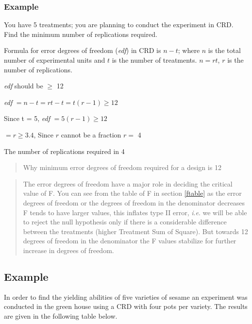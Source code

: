 \documentclass[
]{book}
\begin{document}
\hypertarget{example-10}{%
\subsubsection*{Example}\label{example-10}}

You have 5 treatments; you are planning to conduct the experiment in CRD. Find the minimum number of replications required.

Formula for error degrees of freedom (\emph{edf}) in CRD is \(n - t\); where \(n\) is the total number of experimental units and \(t\) is the number of treatments. \(n = rt\), \(r\) is the number of replications.

\emph{edf} should be \(\geq\) 12

\emph{edf} \(= n - t = rt - t = t\left( r - 1 \right) \geq 12\)

Since t = 5, \emph{edf} \(= 5\left( r - 1 \right) \geq 12\)

\(= r \geq 3.4\), Since \(r\) cannot be a fraction \(r =\) 4

The number of replications required in 4

\begin{quote}
Why minimum error degrees of freedom required for a design is 12
\end{quote}

\begin{quote}
The error degrees of freedom have a major role in deciding the critical value of F. You can see from the table of F in section \ref{ftable} as the error degrees of freedom or the degrees of freedom in the denominator decreases F tends to have larger values, this inflates type II error, \emph{i}.\emph{e}. we will be able to reject the null hypothesis only if there is a considerable difference between the treatments (higher
Treatment Sum of Square). But towards 12 degrees of freedom in the denominator the F values stabilize for further increase in degrees of freedom.
\end{quote}

\hypertarget{example-11}{%
\subsection{Example}\label{example-11}}

In order to find the yielding abilities of five varieties of sesame an experiment was conducted in the green house using a CRD with four pots per variety. The results are given in the following table below.
\end{document}
